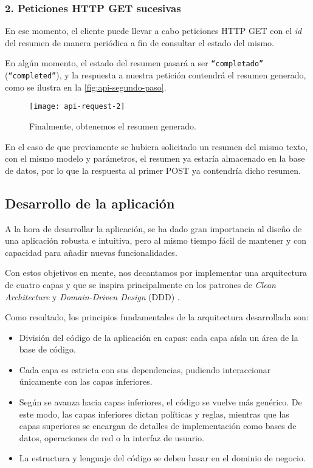 \subsubsection{2. Peticiones HTTP GET sucesivas}

En ese momento, el cliente puede llevar a cabo peticiones HTTP GET con el \emph{id} del resumen de manera periódica a fin de consultar el estado del mismo.

En algún momento, el estado del resumen pasará a ser \texttt{``completado''} (\texttt{``completed''}), y la respuesta a nuestra petición contendrá el resumen generado, como se ilustra en la \autoref{fig:api-segundo-paso}.

\begin{figure}[h]
	\centering
	\texttt{[image: api-request-2]}
	\caption{Finalmente, obtenemos el resumen generado.}
	\label{fig:api-segundo-paso}
\end{figure}

En el caso de que previamente se hubiera solicitado un resumen del mismo texto, con el mismo modelo y parámetros, el resumen ya estaría almacenado en la base de datos, por lo que la respuesta al primer POST ya contendría dicho resumen.

\newpage

\subsection{Desarrollo de la aplicación}

A la hora de desarrollar la aplicación, se ha dado gran importancia al diseño de una aplicación robusta e intuitiva, pero al mismo tiempo fácil de mantener y con capacidad para añadir nuevas funcionalidades.

Con estos objetivos en mente, nos decantamos por implementar una arquitectura de cuatro capas y que se inspira principalmente en los patrones de \emph{Clean Architecture} \cite{martin15} y \emph{Domain-Driven Design} (DDD) \cite{vernon13}.

Como resultado, los principios fundamentales de la arquitectura desarrollada son:

\begin{itemize} [\textbullet]
	\item División del código de la aplicación en capas: cada capa aísla un área de la base de código.
	
	\item Cada capa es estricta con sus dependencias, pudiendo interaccionar únicamente con las capas inferiores.
	
	\item Según se avanza hacia capas inferiores, el código se vuelve más genérico. De este modo, las capas inferiores dictan políticas y reglas, mientras que las capas superiores se encargan de detalles de implementación como bases de datos, operaciones de red o la interfaz de usuario.
	
	\item La estructura y lenguaje del código se deben basar en el dominio de negocio.
\end{itemize}

